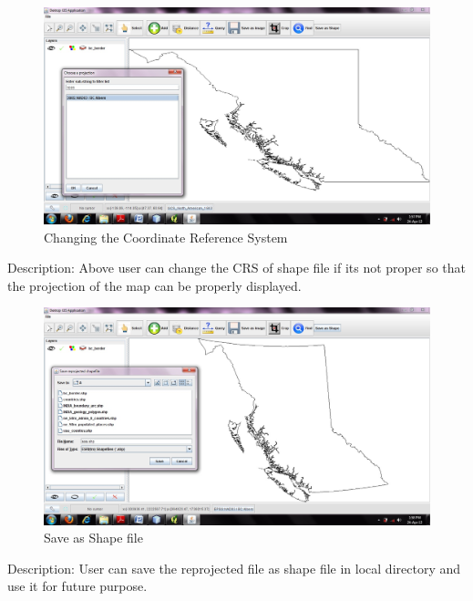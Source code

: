 \begin{figure}[h]
\begin{center}
  \includegraphics[scale=0.43] {18.jpg}
  \caption[Screenshot - Changing The CRS]{Changing the Coordinate Reference System}
\end{center}
\end{figure}
Description: Above user can change the CRS of shape file if its not proper so that the projection of the map can be properly displayed.
\newpage
\begin{figure}[h]
\begin{center}
  \includegraphics[scale=0.43] {19.jpg}
  \caption[Screenshot - Save as Shape]{Save as Shape file}
\end{center}
\end{figure}
Description: User can save the reprojected file as shape file in local directory and use it for future purpose.


